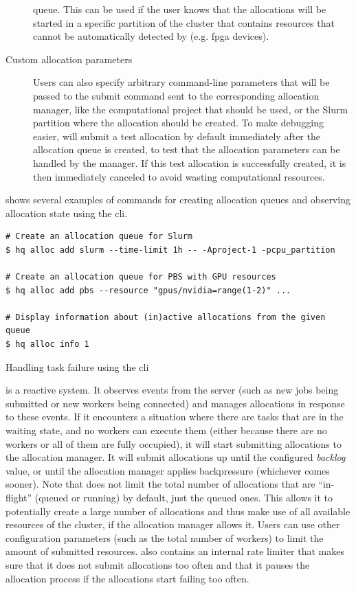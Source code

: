\begin{description}
		queue. This can be used if the user knows that the allocations will be started in a specific
		partition of the cluster that contains resources that cannot be automatically detected by
		\hyperqueue{} (e.g. \gls{fpga} devices).
	\item[Custom allocation parameters] Users can also specify arbitrary command-line parameters that will be passed to the submit command
		sent to the corresponding allocation manager, like the computational project that should be used,
		or the Slurm partition where the allocation should be created. To make debugging easier,
		\hyperqueue{} will submit a test allocation by default immediately after the allocation
		queue is created, to test that the allocation parameters can be handled by the manager. If this
		test allocation is successfully created, it is then immediately canceled to avoid wasting
		computational resources.
\end{description}

 shows several examples of commands for creating allocation queues and
observing allocation state using the \hyperqueue{} \gls{cli}.

\begin{listing}[h]
	\begin{verbatim}
# Create an allocation queue for Slurm
$ hq alloc add slurm --time-limit 1h -- -Aproject-1 -pcpu_partition

# Create an allocation queue for PBS with GPU resources
$ hq alloc add pbs --resource "gpus/nvidia=range(1-2)" ...

# Display information about (in)active allocations from the given queue
$ hq alloc info 1
	\end{verbatim}
	\caption{Handling task failure using the \hyperqueue{} \gls{cli}}
	\label{lst:hq-cli-autoalloc}
\end{listing}

\Autoalloc{} is a reactive system. It observes events from the server (such as new jobs
being submitted or new workers being connected) and manages allocations in response to these
events. If it encounters a situation where there are tasks that are in the waiting state, and no
workers can execute them (either because there are no workers or all of them are fully occupied),
it will start submitting allocations to the allocation manager. It will submit allocations up until
the configured \emph{backlog} value, or until the allocation manager applies backpressure
(whichever comes sooner). Note that \autoalloc{} does not limit the total number of
allocations that are ``in-flight'' (queued or running) by default, just the queued ones. This
allows it to potentially create a large number of allocations and thus make use of all available resources of
the cluster, if the allocation manager allows it. Users can use other configuration parameters
(such as the total number of workers) to limit the amount of submitted resources.
\Autoalloc{} also contains an internal rate limiter that makes sure that it does not
submit allocations too often and that it pauses the allocation process if the allocations start
failing too often.

